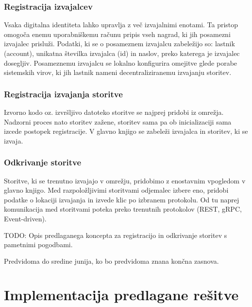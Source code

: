\documentclass[a4paper, 12pt]{book}
\begin{document}
\subsection{Registracija izvajalcev}
\label{registerWorker}
Vsaka digitalna identiteta lahko upravlja z več izvajalnimi enotami.
Ta pristop omogoča enemu uporabniškemu računu pripis vseh nagrad, ki jih posamezni izvajalec prisluži.
Podatki, ki se o posameznem izvajalcu zabeležijo so: lastnik (account), unikatna številka izvajalca (id) in naslov, preko katerega je izvajalec dosegljiv.
Posameznemu izvajalcu se lokalno konfigurira omejitve glede porabe sistemskih virov, ki jih lastnik nameni decentraliziranemu izvajanju storitev.

\subsection{Registracija izvajanja storitve}
\label{registerExecution}
Izvorno kodo oz. izvršljivo datoteko storitve se najprej pridobi iz omrežja.
Nadzorni proces nato storitev zažene, storitev sama pa ob inicializaciji sama izcede postopek registracije.
V glavno knjigo se zabeleži izvajalca in storitev, ki se izvaja.

\subsection{Odkrivanje storitve}
\label{serviceDiscovery}
Storitve, ki se trenutno izvajajo v omrežju, pridobimo z enostavnim vpogledom v glavno knjigo.
Med razpoložljivimi storitvami odjemalec izbere eno, pridobi podatke o lokaciji izvajanja in izvede klic po izbranem protokolu.
Od tu naprej komunikacija med storitvami poteka preko trenutnih protokolov (REST, gRPC, Event-driven).

TODO: Opis predlaganega koncepta za registracijo in odkrivanje storitev s pametnimi pogodbami.

Predvidoma do sredine junija, ko bo predvidoma znana končna zasnova.

\chapter{Implementacija predlagane rešitve}
\label{ch5}
\end{document}
